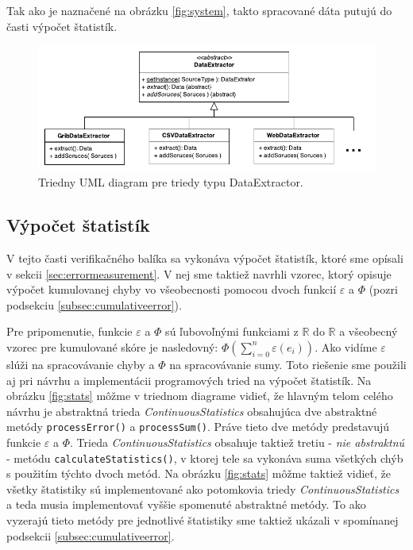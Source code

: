 \noindent Tak ako je naznačené na obrázku \ref{fig:system},  takto spracované dáta putujú do časti výpočet štatistík.

\begin{figure}
	\centering
	\includegraphics[width = 6in]{dataextractor}
	\caption{Triedny UML diagram pre triedy typu DataExtractor.}
	\label{fig:dataextractor} 
\end{figure}

\subsection{Výpočet štatistík}
V tejto časti verifikačného balíka sa vykonáva výpočet štatistík, ktoré sme opísali v sekcii \ref{sec:errormeasurement}. V nej sme taktiež navrhli vzorec, ktorý opisuje výpočet kumulovanej chyby vo všeobecnosti pomocou dvoch funkcií $ \varepsilon $ a $ \Phi $ (pozri podsekciu \ref{subsec:cumulativeerror}).


Pre pripomenutie, funkcie $ \varepsilon $ a $ \Phi $ sú ľubovoľnými funkciami z $\mathbb{R}$ do $\mathbb{R}$ a všeobecný vzorec pre kumulované skóre je nasledovný: $ \Phi(\sum\limits_{i=0}^{n} \varepsilon(e_i)) $. Ako vidíme $ \varepsilon $ slúži na spracovávanie chyby a $ \Phi $ na spracovávanie sumy. Toto riešenie sme použili aj pri návrhu a implementácii programových tried na výpočet štatistík. Na obrázku \ref{fig:stats} môžme v triednom diagrame vidieť, že hlavným telom celého návrhu je abstraktná trieda \textit{ContinuousStatistics} obsahujúca dve abstraktné metódy \texttt{processError()} a \texttt{processSum()}. Práve tieto dve metódy predstavujú funkcie $ \varepsilon $ a $ \Phi $. Trieda \textit{ContinuousStatistics} obsahuje taktiež tretiu - \textit{nie abstraktnú} - metódu \texttt{calculateStatistics()}, v ktorej tele sa vykonáva suma všetkých chýb s použitím týchto dvoch metód. Na obrázku \ref{fig:stats} môžme taktiež vidieť, že všetky štatistiky sú implementované ako potomkovia triedy \textit{ContinuousStatistics} a teda musia implementovať vyššie spomenuté abstraktné metódy. To ako vyzerajú tieto metódy pre jednotlivé štatistiky sme taktiež ukázali v spomínanej podsekcii \ref{subsec:cumulativeerror}.

